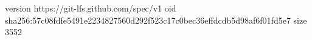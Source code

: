 version https://git-lfs.github.com/spec/v1
oid sha256:57c08fdfe5491e2234827560d292f523c17c0bec36effdcdb5d98af6f01fd5e7
size 3552
